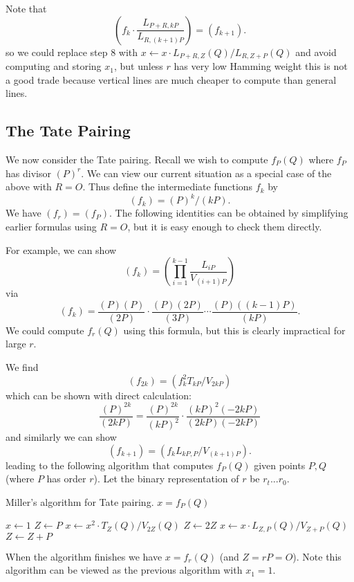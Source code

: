 Note that
\[
\left(
f_k \cdot \frac{L_{P+R,kP}}{L_{R,(k+1)P}}
\right) = (f_{k+1}) .
\]
so we could replace step 8 with
$x \gets x \cdot L_{P+R, Z}(Q) / L_{R,Z+P}(Q)$
and avoid computing and storing $x_1$, but unless
$r$ has very low Hamming weight this is not a good trade
because vertical lines are much cheaper to compute than general lines.

\subsection {The Tate Pairing}

We now consider the Tate pairing. Recall we wish to compute
$f_P(Q)$ where $f_P$ has divisor $(P)^r$.
We can view our current situation as a special case of the above
with $R = O$.
Thus define the intermediate functions $f_k$ by
\[ (f_k) = (P)^k / (kP) . \]
We have $(f_r) = (f_P)$.
The following identities can be obtained by simplifying
earlier formulas using $R=O$, but it is easy enough to check them directly.

For example, we can show
\[ (f_k) = \left(\prod_{i=1}^{k-1} \frac{L_{iP}}{V_{(i+1)P}}\right) \]
via
\[ (f_k) =
\frac{(P)(P)}{(2P)}
\cdot
\frac{(P)(2P)}{(3P)}
\cdots
\frac{(P)((k-1)P)}{(kP)} .
\]
We could compute $f_r(Q)$ using this formula,
but this is clearly impractical for large $r$.

We find
\[
(f_{2k}) = (f_k^2 T_{kP} / V_{2kP} )
\]
which can be shown with direct calculation:
\[
\frac{(P)^{2k}}{(2kP)} =
\frac{(P)^{2k}}{(kP)^2} \cdot
\frac{(kP)^2 (-2kP)}{(2kP)(-2kP)}
\]
and similarly we can show
\[
(f_{k+1}) = (f_k L_{kP,P} / V_{(k+1)P}).
\]
leading to the following algorithm that
computes $f_P(Q)$ given points $P,Q$ (where $P$ has order $r$).
Let the binary representation of $r$ be $r_t ... r_0$.

\begin{algorithm}
\caption{Miller's algorithm for Tate pairing. $x = f_P(Q)$}
\begin{algorithmic}[1]
\STATE $x \gets 1$
\STATE $Z \gets P$
    \STATE $x \gets x^2 \cdot T_Z(Q) / V_{2Z}(Q)$
    \STATE $Z \gets 2Z$
	\STATE $x \gets x \cdot L_{Z,P}(Q) / V_{Z+P}(Q)$
	\STATE $Z \gets Z + P$
    \ENDIF
\ENDFOR
\end{algorithmic}
\end{algorithm}

When the algorithm finishes we have $x = f_r(Q)$ (and $Z = rP = O$).
Note this algorithm can be viewed as the previous algorithm with $x_1 = 1$.

